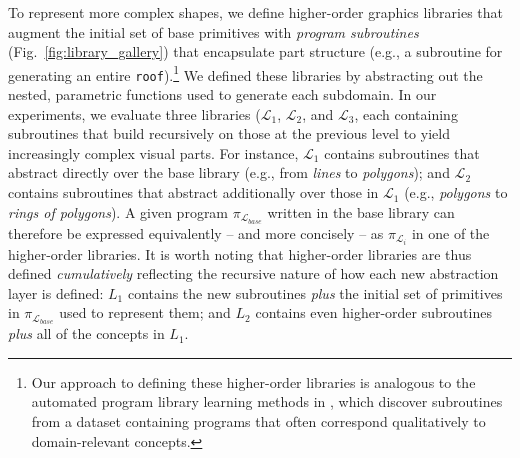 \documentclass[10pt,letterpaper]{article}
\begin{document}
To represent more complex shapes, we define higher-order graphics libraries that augment the initial set of base primitives with \textit{program subroutines} (Fig.~\ref{fig:library_gallery}) that encapsulate part structure (e.g., a subroutine for generating an entire \texttt{roof}).\footnote{Our approach to defining these higher-order libraries is analogous to the automated program library learning methods in , which discover subroutines from a dataset containing programs that often correspond qualitatively to domain-relevant concepts.}
We defined these libraries by abstracting out the nested, parametric functions used to generate each subdomain. 
In our experiments, we evaluate three libraries ($\mathcal{L}_1$, $\mathcal{L}_2$, and $\mathcal{L}_3$, each containing subroutines that build recursively on those at the previous level to yield increasingly complex visual parts.
For instance, $\mathcal{L}_1$ contains subroutines that abstract directly over the base library (e.g., from \textit{lines} to \textit{polygons}); and $\mathcal{L}_2$ contains subroutines that abstract additionally over those in $\mathcal{L}_1$ (e.g., \textit{polygons} to \textit{rings of polygons}). 
A given program $\pi_{\mathcal{L}_{base}}$ written in the base library can therefore be expressed equivalently -- and more concisely -- as $\pi_{\mathcal{L}_{i}}$ in one of the higher-order libraries. 
It is worth noting that higher-order libraries are thus defined \textit{cumulatively} reflecting the recursive nature of how each new abstraction layer is defined: $L_1$ contains the new subroutines \textit{plus} the initial set of primitives in $\pi_{\mathcal{L}_{base}}$ used to represent them; and $L_2$ contains even higher-order subroutines \textit{plus} all of the concepts in $L_1$.

\end{document}
